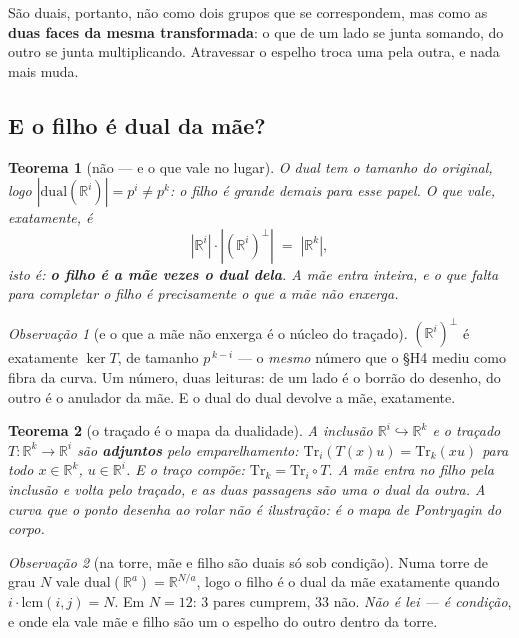 \documentclass[11pt]{article}
\newcommand{\R}{\mathbb R}
\theoremstyle{plain}
\newtheorem{teorema}{Teorema}
\theoremstyle{remark}
\newtheorem{obs}{Observação}
\begin{document}
\noindent São duais, portanto, não como dois grupos que se correspondem, mas como as \textbf{duas
faces da mesma transformada}: o que de um lado se junta somando, do outro se junta multiplicando.
Atravessar o espelho troca uma pela outra, e nada mais muda.

\subsection*{E o filho é dual da mãe?}

\begin{teorema}[não --- e o que vale no lugar]
O dual tem o tamanho do original, logo $|\mathrm{dual}(\R^i)|=p^i\ne p^k$: o filho é grande demais
para esse papel. O que vale, exatamente, é
\[
 |\R^i|\cdot|(\R^i)^{\perp}| \;=\; |\R^k|,
\]
isto é: \textbf{o filho é a mãe vezes o dual dela}. A mãe entra inteira, e o que falta para completar
o filho é precisamente o que a mãe não enxerga.
\end{teorema}

\begin{obs}[e o que a mãe não enxerga é o núcleo do traçado]
$(\R^i)^{\perp}$ é exatamente $\ker T$, de tamanho $p^{\,k-i}$ --- o \emph{mesmo} número que o
\S H4 mediu como fibra da curva. Um número, duas leituras: de um lado é o borrão do desenho, do outro
é o anulador da mãe. E o dual do dual devolve a mãe, exatamente.
\end{obs}

\begin{teorema}[o traçado é o mapa da dualidade]
A inclusão $\R^i\hookrightarrow\R^k$ e o traçado $T:\R^k\to\R^i$ são \textbf{adjuntos} pelo
emparelhamento: $\mathrm{Tr}_i(T(x)u)=\mathrm{Tr}_k(xu)$ para todo $x\in\R^k$, $u\in\R^i$. E o traço
compõe: $\mathrm{Tr}_k=\mathrm{Tr}_i\circ T$. A mãe \emph{entra} no filho pela inclusão e \emph{volta}
pelo traçado, e as duas passagens são uma o dual da outra. \emph{A curva que o ponto desenha ao rolar
não é ilustração: é o mapa de Pontryagin do corpo.}
\end{teorema}

\begin{obs}[na torre, mãe e filho são duais só sob condição]
Numa torre de grau $N$ vale $\mathrm{dual}(\R^a)=\R^{N/a}$, logo o filho é o dual da mãe exatamente
quando $i\cdot\mathrm{lcm}(i,j)=N$. Em $N=12$: $3$ pares cumprem, $33$ não. \emph{Não é lei --- é
condição}, e onde ela vale mãe e filho são um o espelho do outro dentro da torre.
\end{obs}
\end{document}
